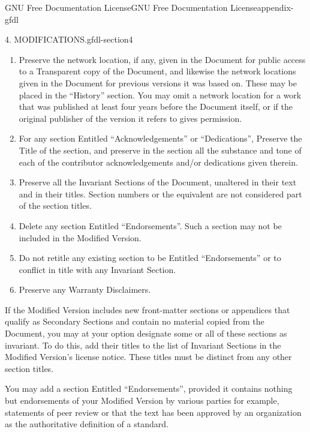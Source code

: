 \documentclass[oneside,10pt,]{book}
\numberwithin{equation}{section}
\begin{document}
\begin{appendixptx}{GNU Free Documentation License}{}{GNU Free Documentation License}{}{}{appendix-gfdl}
\begin{paragraphs}{4. MODIFICATIONS.}{gfdl-section4}
\begin{enumerate}[label=\Alph*.]
\item\hypertarget{li-44}{}\hypertarget{p-732}{}%
Preserve the network location, if any, given in the Document for public access to a Transparent copy of the Document, and likewise the network locations given in the Document for previous versions it was based on.  These may be placed in the ``History'' section. You may omit a network location for a work that was published at least four years before the Document itself, or if the original publisher of the version it refers to gives permission.%
\item\hypertarget{li-45}{}\hypertarget{p-733}{}%
For any section Entitled ``Acknowledgements'' or ``Dedications'', Preserve the Title of the section, and preserve in the section all the substance and tone of each of the contributor acknowledgements and\slash{}or dedications given therein.%
\item\hypertarget{li-46}{}\hypertarget{p-734}{}%
Preserve all the Invariant Sections of the Document, unaltered in their text and in their titles. Section numbers or the equivalent are not considered part of the section titles.%
\item\hypertarget{li-47}{}\hypertarget{p-735}{}%
Delete any section Entitled ``Endorsements''. Such a section may not be included in the Modified Version.%
\item\hypertarget{li-48}{}\hypertarget{p-736}{}%
Do not retitle any existing section to be Entitled ``Endorsements'' or to conflict in title with any Invariant Section.%
\item\hypertarget{li-49}{}\hypertarget{p-737}{}%
Preserve any Warranty Disclaimers.%
\end{enumerate}
\hypertarget{p-738}{}%
If the Modified Version includes new front-matter sections or appendices that qualify as Secondary Sections and contain no material copied from the Document, you may at your option designate some or all of these sections as invariant. To do this, add their titles to the list of Invariant Sections in the Modified Version's license notice. These titles must be distinct from any other section titles.%
\par
\hypertarget{p-739}{}%
You may add a section Entitled ``Endorsements'', provided it contains nothing but endorsements of your Modified Version by various parties \textemdash{} for example, statements of peer review or that the text has been approved by an organization as the authoritative definition of a standard.%
\par
\hypertarget{p-740}{}%

\end{paragraphs}
\end{appendixptx}
\end{document}
